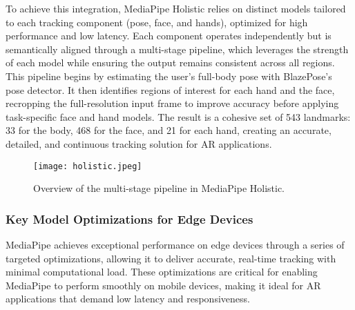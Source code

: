 To achieve this integration, MediaPipe Holistic relies on distinct models tailored to each tracking component (pose, face, and hands), optimized for high performance and low latency.
Each component operates independently but is semantically aligned through a multi-stage pipeline, which leverages the strength of each model while ensuring the output remains consistent across all regions. This pipeline begins by estimating the user’s full-body pose with BlazePose’s pose detector.
It then identifies regions of interest for each hand and the face, recropping the full-resolution input frame to improve accuracy before applying task-specific face and hand models.
The result is a cohesive set of 543 landmarks: 33 for the body, 468 for the face, and 21 for each hand, creating an accurate, detailed, and continuous tracking solution for AR applications.
\begin{figure}[h]
    \centering
    \texttt{[image: holistic.jpeg]}
    \caption{Overview of the multi-stage pipeline in MediaPipe Holistic.}
    \vspace{0.1cm}
    \label{fig:holisticArchitecture}
\end{figure}

\subsubsection{Key Model Optimizations for Edge Devices}


MediaPipe achieves exceptional performance on edge devices through a series of targeted optimizations, allowing it to deliver accurate, real-time tracking with minimal computational load.
These optimizations are critical for enabling MediaPipe to perform smoothly on mobile devices, making it ideal for AR applications that demand low latency and responsiveness.

